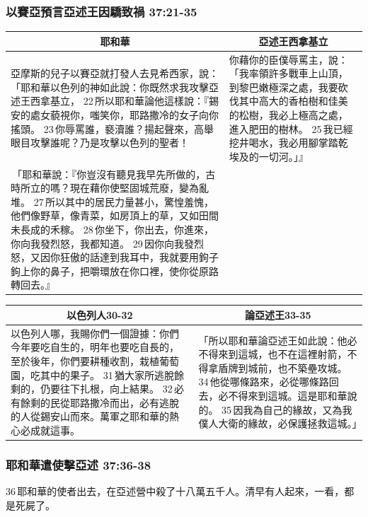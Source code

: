 \subsubsection{以賽亞預言亞述王因驕致禍 37:21-35}
\begin{table}[H]
\centering
\begin{tabular}{p{10.75cm}|p{6.50cm}}\hline\hline
\multicolumn{1}{c|}{耶和華}&\multicolumn{1}{c}{亞述王西拿基立}\\\hline
亞摩斯的兒子以賽亞就打發人去見希西家，說：「耶和華以色列的神如此說：你既然求我攻擊亞述王西拿基立， 22 所以耶和華論他這樣說：『錫安的處女藐視你，嗤笑你，耶路撒冷的女子向你搖頭。 23 你辱罵誰，褻瀆誰？揚起聲來，高舉眼目攻擊誰呢？乃是攻擊以色列的聖者！ 
&你藉你的臣僕辱罵主，說：「我率領許多戰車上山頂，到黎巴嫩極深之處，我要砍伐其中高大的香柏樹和佳美的松樹，我必上極高之處，進入肥田的樹林。 25 我已經挖井喝水，我必用腳掌踏乾埃及的一切河。」』\\\hline
 「耶和華說：『你豈沒有聽見我早先所做的，古時所立的嗎？現在藉你使堅固城荒廢，變為亂堆。 27 所以其中的居民力量甚小，驚惶羞愧，他們像野草，像青菜，如房頂上的草，又如田間未長成的禾稼。 28 你坐下，你出去，你進來，你向我發烈怒，我都知道。 29 因你向我發烈怒，又因你狂傲的話達到我耳中，我就要用鉤子鉤上你的鼻子，把嚼環放在你口裡，使你從原路轉回去。』&\\\hline
\end{tabular}
\end{table}


\begin{table}[H]
\centering
\begin{tabular}{p{8.75cm}|p{8.50cm}}\hline\hline
\multicolumn{1}{c|}{以色列人30-32}&\multicolumn{1}{c}{論亞述王33-35}\\\hline
以色列人哪，我賜你們一個證據：你們今年要吃自生的，明年也要吃自長的，至於後年，你們要耕種收割，栽植葡萄園，吃其中的果子。 31 猶大家所逃脫餘剩的，仍要往下扎根，向上結果。 32 必有餘剩的民從耶路撒冷而出，必有逃脫的人從錫安山而來。萬軍之耶和華的熱心必成就這事。
&「所以耶和華論亞述王如此說：他必不得來到這城，也不在這裡射箭，不得拿盾牌到城前，也不築壘攻城。 34 他從哪條路來，必從哪條路回去，必不得來到這城。這是耶和華說的。 35 因我為自己的緣故，又為我僕人大衛的緣故，必保護拯救這城。」\\\hline
\end{tabular}
\end{table}





\subsubsection{耶和華遣使擊亞述 37:36-38}
36 耶和華的使者出去，在亞述營中殺了十八萬五千人。清早有人起來，一看，都是死屍了。

